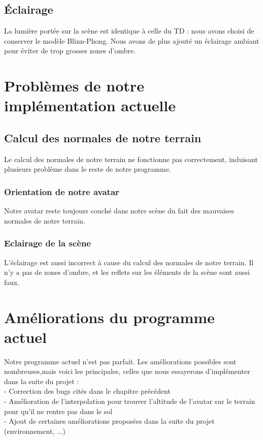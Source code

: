 \documentclass{report}
\begin{document}
\section{Éclairage}	
La lumière portée sur la scène est identique à celle du TD : nous avons choisi de conserver le modèle Blinn-Phong.
Nous avons de plus ajouté un éclairage ambiant pour éviter de trop grosses zones d'ombre.

\chapter{Problèmes de notre implémentation actuelle}
\section{Calcul des normales de notre terrain}
Le calcul des normales de notre terrain ne fonctionne pas correctement, induisant plusieurs problème dans le reste de notre programme.
\subsection{Orientation de notre avatar}
Notre avatar reste toujours couché dans notre scène du fait des mauvaises normales de notre terrain. 
\subsection{Eclairage de la scène}
L'éclairage est aussi incorrect à cause du calcul des normales de notre terrain. Il n'y a pas de zones d'ombre, et les reflets sur les éléments de la scène sont aussi faux.

\chapter{Améliorations du programme actuel}
Notre programme actuel n'est pas parfait. Les améliorations possibles sont nombreuses,mais voici les principales, celles que nous essayerons d'implémenter dans la suite du projet :\\

- Correction des bugs cités dans le chapitre précédent\\

- Amélioration de l'interpolation pour trouver l'altitude de l'avatar sur le terrain pour qu'il ne rentre pas dans le sol\\


- Ajout de certaines améliorations proposées dans la suite du projet (environnement, ...)
\end{document}
